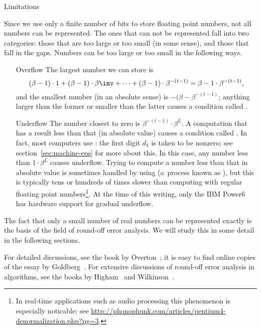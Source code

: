  {Limitations}
\label{sec:exceptions}

Since we use only a finite number of bits to store floating point
numbers, not all numbers can be represented. The ones that can not be
represented fall into two categories: those that are too large or too
small (in some sense), and those that fall in the gaps. Numbers can be
too large or too small in the following ways.
\begin{itemize}
\item[Overflow] The largest number we can store is
  \[ (\beta-1)\cdot1+(\beta-1)\cdot\beta\inv+\cdots
  +(\beta-1)\cdot\beta^{-(t-1)}=\beta-1\cdot\beta^{-(t-1)},
  \]
  and the smallest number (in an absolute
  sense) is $-(\beta-\beta^{-(t-1)}$; anything larger than the
  former or smaller than the latter causes a condition called
  .
\item[Underflow]The number closest to zero is $\beta^{-(t-1)}\cdot
  \beta^L$. A computation that has a result less than that (in
  absolute value) causes a condition called . In
  fact, most computers use : the first digit $d_1$ is taken to be nonzero; see
  section~\ref{sec:machine-eps} for more about this. In this case, any
  number less than $1\cdot\beta^L$ causes underflow. Trying
  to compute a number less than that in absolute value is sometimes
  handled by using 
  (a~process known as ), but this is
  typically tens or hundreds of times slower than computing with
  regular floating point numbers\footnote{In real-time applications
    such as audio processing this phenomenon is especially noticable;
    see \url{http://phonophunk.com/articles/pentium4-denormalization.php?pg=3}.}. At
  the time of this writing, only the IBM Power6 has
  hardware support for gradual underflow.
\end{itemize}
The fact that only a small number of real numbers can be represented
exactly is the basis of the field of round-off error analysis. We will
study this in some detail in the following sections.

For detailed discussions, see the book by
Overton~\cite{Overton:754book}; it is easy to find online copies of
the essay by Goldberg~\cite{goldberg:floatingpoint}. For extensive
discussions of round-off error analysis in algorithms, see the books
by Higham~\cite{Higham:2002:ASN} and Wilkinson~\cite{Wilkinson:roundoff}.

